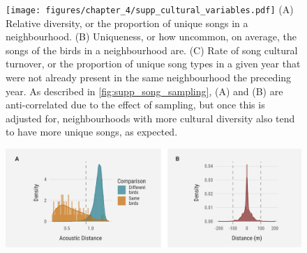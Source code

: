 \documentclass[9pt, onecolumn, twoside, lineno]{gsajnl}
\begin{document}
\begin{figure}[tbp]
    \centering
    \texttt{[image: figures/chapter\_4/supp\_cultural\_variables.pdf]}
    {
        (A) Relative diversity, or the proportion of unique songs in a neighbourhood.
        (B) Uniqueness, or how uncommon, on average, the songs of the birds in a neighbourhood are.
        (C) Rate of song cultural turnover, or the proportion of unique song types in a given year that were not already present in the same neighbourhood the preceding year.
        As described in \autoref{fig:supp_song_sampling}, (A) and (B) are anti-correlated due to the effect of sampling, but once this is adjusted for, neighbourhoods with more cultural diversity also tend to have more unique songs, as expected.
        }
    \label{fig:supp_cultural_variables}
\end{figure}

\begin{figure}[tbp]
    \centering
    \includegraphics[width=\linewidth]{figures/chapter_4/supp_acoustic_distance_threshold.pdf}
    \label{fig:supp_acoustic_distance_threshold}
\end{figure}
\end{document}
